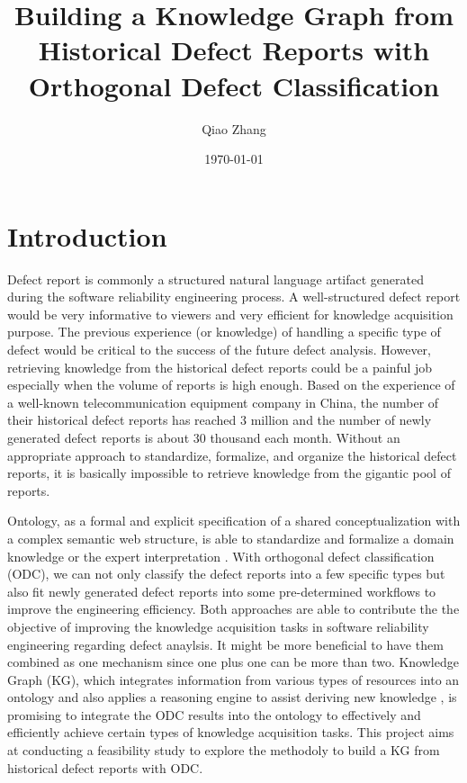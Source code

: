 \documentclass[12pt] {article}
\begin{document}
\title{Building a Knowledge Graph from Historical Defect Reports with Orthogonal Defect Classification}
\author{Qiao Zhang}
\date \today
\maketitle

\thispagestyle{empty}

\bigskip
\pagebreak
\setcounter{page}{1}
\section{Introduction}
Defect report is commonly a structured natural language artifact generated during the software reliability engineering process.
A well-structured defect report would be very informative to viewers and very efficient for knowledge acquisition purpose.
The previous experience (or knowledge) of handling a specific type of defect would be critical to the success of the future defect analysis.
However, retrieving knowledge from the historical defect reports could be a painful job especially when the volume of reports is high enough.
Based on the experience of a well-known telecommunication equipment company in China, the number of their historical defect reports has reached 3 million and the number of newly generated defect reports is about 30 thousand each month.
Without an appropriate approach to standardize, formalize, and organize the historical defect reports, it is basically impossible to retrieve knowledge from the gigantic pool of reports.\par

Ontology, as a formal and explicit specification of a shared conceptualization with a complex semantic web structure, is able to standardize and formalize a domain knowledge or the expert interpretation \cite{christina2016an}.
With orthogonal defect classification (ODC), we can not only classify the defect reports into a few specific types but also fit newly generated defect reports into some pre-determined workflows to improve the engineering efficiency.
Both approaches are able to contribute the the objective of improving the knowledge acquisition tasks in software reliability engineering regarding defect anaylsis. 
It might be more beneficial to have them combined as one mechanism since one plus one can be more than two.
Knowledge Graph (KG), which integrates information from various types of resources into an ontology and also applies a reasoning engine to assist deriving new knowledge \cite{ehrlinger2016towards}, is promising to integrate the ODC results into the ontology to effectively and efficiently achieve certain types of knowledge acquisition tasks.
This project aims at conducting a feasibility study to explore the methodoly to build a KG from historical defect reports with ODC.
\end{document}
